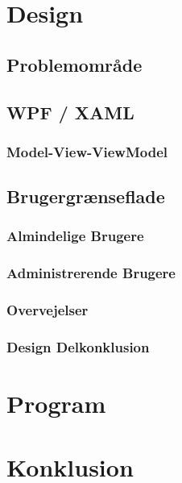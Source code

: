 \chapter{Design}

\section{Problemområde}

\section{WPF / XAML}
\subsection{Model-View-ViewModel}

\section{Brugergrænseflade}
\subsection{Almindelige Brugere}
\subsection{Administrerende Brugere}
\subsection{Overvejelser}
\subsection{Design Delkonklusion}

\chapter{Program}


\chapter{Konklusion}
